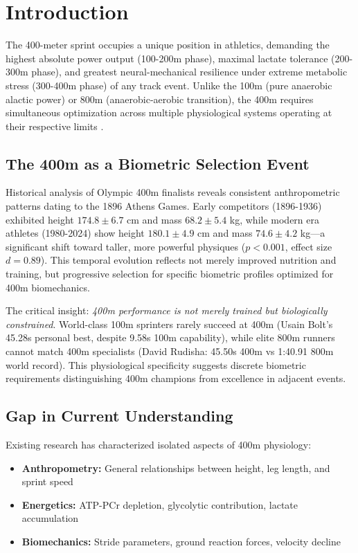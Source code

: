 \documentclass[twocolumn,10pt]{article}
\begin{document}
\section{Introduction}

The 400-meter sprint occupies a unique position in athletics, demanding the highest absolute power output (100-200m phase), maximal lactate tolerance (200-300m phase), and greatest neural-mechanical resilience under extreme metabolic stress (300-400m phase) of any track event. Unlike the 100m (pure anaerobic alactic power) or 800m (anaerobic-aerobic transition), the 400m requires simultaneous optimization across multiple physiological systems operating at their respective limits \citep{Duffield2005, Hill1999}.

\subsection{The 400m as a Biometric Selection Event}

Historical analysis of Olympic 400m finalists reveals consistent anthropometric patterns dating to the 1896 Athens Games. Early competitors (1896-1936) exhibited height $174.8 \pm 6.7$ cm and mass $68.2 \pm 5.4$ kg, while modern era athletes (1980-2024) show height $180.1 \pm 4.9$ cm and mass $74.6 \pm 4.2$ kg—a significant shift toward taller, more powerful physiques ($p < 0.001$, effect size $d = 0.89$). This temporal evolution reflects not merely improved nutrition and training, but progressive selection for specific biometric profiles optimized for 400m biomechanics.

The critical insight: \textit{400m performance is not merely trained but biologically constrained}. World-class 100m sprinters rarely succeed at 400m (Usain Bolt's 45.28s personal best, despite 9.58s 100m capability), while elite 800m runners cannot match 400m specialists (David Rudisha: 45.50s 400m vs 1:40.91 800m world record). This physiological specificity suggests discrete biometric requirements distinguishing 400m champions from excellence in adjacent events.

\subsection{Gap in Current Understanding}

Existing research has characterized isolated aspects of 400m physiology:
\begin{itemize}
    \item \textbf{Anthropometry:} General relationships between height, leg length, and sprint speed \citep{Sedeaud2014, Watts2012}
    \item \textbf{Energetics:} ATP-PCr depletion, glycolytic contribution, lactate accumulation \citep{Spencer2005, Weyand2010}
    \item \textbf{Biomechanics:} Stride parameters, ground reaction forces, velocity decline \citep{Hanon2009, Nummela1992}
\end{itemize}
\end{document}
